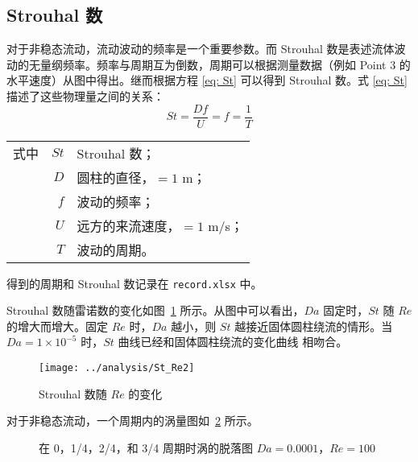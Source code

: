 \subsection{Strouhal 数}

对于非稳态流动，流动波动的频率是一个重要参数。而 Strouhal 数是表述流体波动的无量纲频率。频率与周期互为倒数，周期可以根据测量数据（例如 Point 3 的水平速度）从图中得出。继而根据方程 \eqref{eq: St} 可以得到 Strouhal 数。式 \eqref{eq: St} 描述了这些物理量之间的关系：
\begin{equation}\label{eq: St}
	St = \frac{Df}{U} = f = \frac{1}{T}
\end{equation}
\begin{tabularx}{\textwidth}{@{}l@{\quad}r@{——}X@{}}
	式中 & $St$ & Strouhal 数；\\
		& $D$ & 圆柱的直径，$=1$ m；\\
		& $f$ & 波动的频率；\\
		& $U$ & 远方的来流速度，$=1$ m/s；\\
		& $T$ & 波动的周期。 
\end{tabularx}\vspace{3.15bp}
得到的周期和 Strouhal 数记录在 \texttt{record.xlsx} 中。

Strouhal 数随雷诺数的变化如图~\ref{fig: St} 所示。从图中可以看出，$Da$ 固定时，$St$ 随 $Re$ 的增大而增大。固定 $Re$ 时，$Da$ 越小，则 $St$ 越接近固体圆柱绕流的情形。当 $Da=1 \times 10^{-5}$ 时，$St$ 曲线已经和固体圆柱绕流的变化曲线 \cite{} 相吻合。

\begin{figure}
	\centering
	\texttt{[image: ../analysis/St\_Re2]}
	\caption{Strouhal 数随 $Re$ 的变化}
	\label{fig: St}
\end{figure}

对于非稳态流动，一个周期内的涡量图如~\ref{fig: 4*vortex} 所示。

\begin{figure}
	\centering
	\begin{minipage}{\textwidth}
		\centering
	\end{minipage}
	\centering
	\begin{minipage}{\textwidth}
		\centering
	\end{minipage}
	\caption{在 0，1/4，2/4，和 3/4 周期时涡的脱落图 $Da=0.0001$，$Re=100$}
	\label{fig: 4*vortex}
\end{figure}

